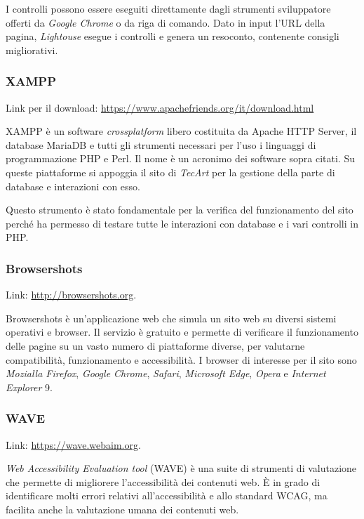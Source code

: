 I controlli possono essere eseguiti direttamente dagli strumenti sviluppatore offerti da \textit{Google Chrome} o da riga di comando. Dato in input l'URL della pagina, \textit{Lightouse} esegue i controlli e genera un resoconto, contenente consigli migliorativi. 


\subsubsection{XAMPP}
\label{test-strumenti-xampp-mamp}
Link per il download: \url{https://www.apachefriends.org/it/download.html}

XAMPP è un software \textit{crossplatform} libero costituita da Apache HTTP Server, il database MariaDB e tutti gli strumenti necessari per l'uso i linguaggi di programmazione PHP e Perl. Il nome è un acronimo dei software sopra citati. Su queste piattaforme si appoggia il sito di \textit{TecArt} per la gestione della parte di database e interazioni con esso.

Questo strumento è stato fondamentale per la verifica del funzionamento del sito perché ha permesso di testare tutte le interazioni con database e i vari controlli in PHP.


\subsubsection{Browsershots}
\label{test-strumenti-browsershots}
Link: \url{http://browsershots.org}. 

Browsershots è un'applicazione web che simula un sito web su diversi sistemi operativi e browser. Il servizio è gratuito e permette di verificare il funzionamento delle pagine su un vasto numero di piattaforme diverse, per valutarne compatibilità, funzionamento e accessibilità. I browser di interesse per il sito sono \textit{Mozialla Firefox}, \textit{Google Chrome}, \textit{Safari}, \textit{Microsoft Edge}, \textit{Opera} e \textit{Internet Explorer} 9.

\subsubsection{WAVE}
\label{test-strumenti-wave}
Link: \url{https://wave.webaim.org}.

\textit{Web Accessibility Evaluation tool} (WAVE) è una suite di strumenti di valutazione che permette di migliorere l'accessibilità dei contenuti web. È in grado di identificare molti errori relativi all'accessibilità e allo standard WCAG, ma facilita anche la valutazione umana dei contenuti web.

